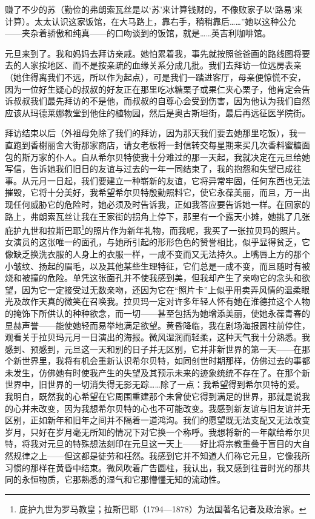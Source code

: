 赚了不少的苏（勤俭的弗朗索瓦丝是以‘苏’来计算钱财的，不像败家子以‘路易’来计算）。太太认识这家饭馆，在大马路上，靠右手，稍稍靠后……”她以这种公允——夹杂着骄傲和纯真——的口吻谈到的饭馆，就是……英吉利咖啡馆。
\par 元旦来到了。我和妈妈去拜访亲戚。她怕累着我，事先就按照爸爸画的路线图将要去的人家按地区、而不是按亲疏的血缘关系分成几批。我们去拜访一位远房表亲（她住得离我们不远，所以作为起点），可是我们一踏进客厅，母亲便惊慌不安，因为一位好生疑心的叔叔的好友正在那里吃冰糖栗子或果仁夹心栗子，他肯定会告诉叔叔我们最先拜访的不是他，而叔叔的自尊心会受到伤害，因为他认为我们自然应该从玛德莱娜教堂到他住的植物园，然后是奥古斯坦街，最后再远征医学院街。
\par 拜访结束以后（外祖母免除了我们的拜访，因为那天我们要去她那里吃饭），我一直跑到香榭丽舍大街那家商店，请女老板将一封信转交每星期来买几次香料蜜糖面包的斯万家的仆人。自从希尔贝特使我十分难过的那一天起，我就决定在元旦给她写信，告诉她我们旧日的友谊与过去的一年一同结束了，我的抱怨和失望已成往事。从元月一日起，我们要建立一种崭新的友谊，它将异常牢固，任何东西也无法摧毁，它将十分美好，我希望希尔贝特殷勤照料它，使它永葆美丽，而且，万一出现任何威胁它的危险时，她必须及时告诉我，正如我答应要告诉她一样。在回家的路上，弗朗索瓦丝让我在王家街的拐角上停下，那里有一个露天小摊，她挑了几张庇护九世和拉斯巴耶\footnote{庇护九世为罗马教皇；拉斯巴耶（1794—1878）为法国著名记者及政治家。}的照片作为新年礼物，而我呢，我买了一张拉贝玛的照片。女演员的这张唯一的面孔，与她所引起的形形色色的赞誉相比，似乎显得贫乏，它像缺乏换洗衣服的人身上的衣服一样，一成不变而又无法持久。上嘴唇上方的那个小皱纹、扬起的眉毛，以及其他某些生理特征，它们总是一成不变，而且随时有被烧和被撞的危险。单凭这张面孔并不使我感到美，但我却产生了亲吻它的念头和欲望，因为它一定接受过无数亲吻，还因为它在“照片卡”上似乎用卖弄风情的温柔眼光及故作天真的微笑在召唤我。拉贝玛一定对许多年轻人怀有她在淮德拉这个人物的掩饰下所供认的种种欲念，而一切——甚至包括为她增添美丽，使她永葆青春的显赫声誉——能使她轻而易举地满足欲望。黄昏降临，我在剧场海报圆柱前停住，观看关于拉贝玛元月一日演出的海报。微风湿润而轻柔，这种天气我十分熟悉。我感到、预感到，元旦这一天和别的日子并无区别，它并非新世界的第一天——在那个新世界里，我将有机会重新认识希尔贝特，如同创世时期那样，仿佛过去的事都未发生，仿佛她有时使我产生的失望及其预示未来的迹象统统不存在了。在那个新世界中，旧世界的一切消失得无影无踪……除了一点：我希望得到希尔贝特的爱。我明白，既然我的心希望在它周围重建那个未曾使它得到满足的世界，那就是说我的心并未改变，因为我想希尔贝特的心也不可能改变。我感到新友谊与旧友谊并无区别，正如新年和旧年之间并不隔着一道鸿沟。我们的愿望既无法支配又无法改变岁月，只好在岁月毫无所知的情况下对它换一个称呼。我想将新的一年献给希尔贝特，将我对元旦的特殊想法刻印在元旦这一天上——好比将宗教重叠于盲目的大自然规律之上——但这都是徒劳和枉然。我感到它并不知道人们称它元旦，它像我所习惯的那样在黄昏中结束。微风吹着广告圆柱，我认出，我又感到往昔时光的那共同的永恒物质，它那熟悉的湿气和它那懵懂无知的流动性。
